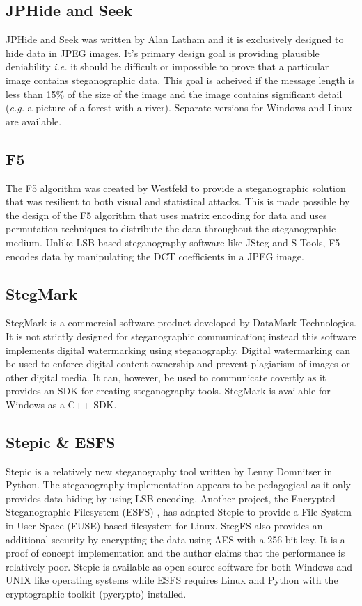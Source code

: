 \subsection{JPHide and Seek}
JPHide and Seek \cite{jphide} was written by Alan Latham and it is exclusively designed to hide data in JPEG images. It's primary design goal is providing plausible deniability \emph{i.e.} it should be difficult or impossible to prove that a particular image contains steganographic data. This goal is acheived if the message length is less than 15\% of the size of the image and the image contains significant detail (\emph{e.g.} a picture of a forest with a river). Separate versions for Windows and Linux are available.
 \subsection{F5}
 The F5 algorithm \cite{westfeld2001f5} was created by Westfeld to provide a steganographic solution that was resilient to both visual and statistical attacks. This is made possible by the design of the F5 algorithm that uses matrix encoding for data and uses permutation techniques to distribute the data throughout the steganographic medium. Unlike LSB based steganography software like JSteg and S-Tools, F5 encodes data by manipulating the DCT coefficients in a JPEG image. 
 \subsection{StegMark}
 StegMark \cite{stegmark} is a commercial software product developed by DataMark Technologies. It is not strictly designed for steganographic communication; instead this software implements digital watermarking using steganography. Digital watermarking can be used to enforce digital content ownership and prevent plagiarism of images or other digital media. It can, however, be used to communicate covertly as it provides an SDK for creating steganography tools. StegMark is available for Windows as a C++ SDK.
 \subsection{Stepic \& ESFS}
 Stepic \cite{stepnic} is a relatively new steganography tool written by Lenny Domnitser in Python. The steganography implementation appears to be pedagogical as it only provides data hiding by using LSB encoding. Another project, the Encrypted Steganographic Filesystem (ESFS) \cite{esfs}, has adapted Stepic to provide a File System in User Space (FUSE) based filesystem for Linux. StegFS also provides an additional security by encrypting the data using AES with a 256 bit key. It is a proof of concept implementation and the author claims that the performance is relatively poor. Stepic is available as open source software for both Windows and UNIX like operating systems while ESFS requires Linux and Python with the cryptographic toolkit (pycrypto) installed.
